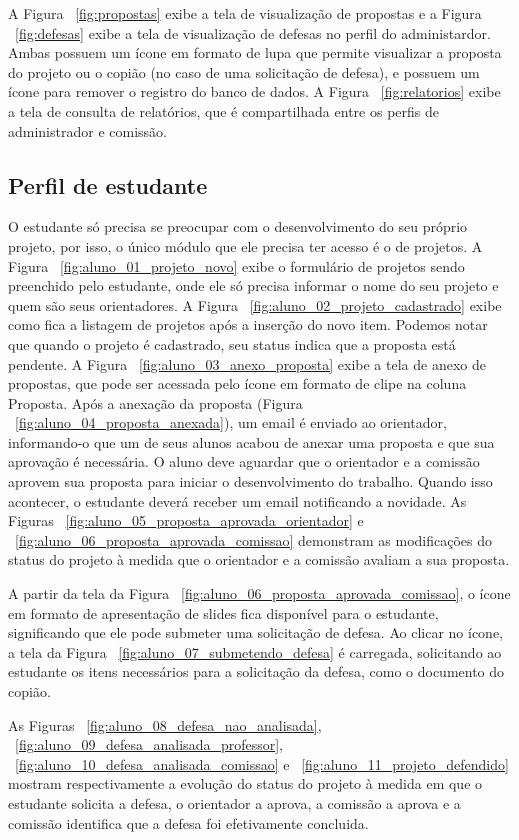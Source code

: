 A Figura ~\ref{fig:propostas} exibe a tela de visualização de propostas e a Figura ~\ref{fig:defesas}
exibe a tela de visualização de defesas no perfil do administardor. Ambas possuem um ícone em formato
de lupa que permite visualizar a proposta do projeto ou o copião (no caso de uma solicitação de defesa), e
possuem um ícone para remover o registro do banco de dados. A Figura ~\ref{fig:relatorios} exibe a tela
de consulta de relatórios, que é compartilhada entre os perfis de administrador e comissão.

\subsection{Perfil de estudante}
O estudante só precisa se preocupar com o desenvolvimento do seu próprio projeto, por isso, o único
módulo que ele precisa ter acesso é o de projetos. A Figura ~\ref{fig:aluno_01_projeto_novo} exibe
o formulário de projetos sendo preenchido pelo estudante, onde ele só precisa informar o nome do
seu projeto e quem são seus orientadores. A Figura ~\ref{fig:aluno_02_projeto_cadastrado} exibe como fica
a listagem de projetos após a inserção do novo item. Podemos notar que quando o projeto é cadastrado, seu 
status indica que a proposta está pendente. A Figura ~\ref{fig:aluno_03_anexo_proposta} exibe a tela de anexo
de propostas, que pode ser acessada pelo ícone em formato de clipe na coluna Proposta. Após a anexação
da proposta (Figura ~\ref{fig:aluno_04_proposta_anexada}), um email é enviado ao orientador, informando-o
que um de seus alunos acabou de anexar uma proposta e que sua aprovação é necessária. O aluno
deve aguardar que o orientador e a comissão aprovem sua proposta para iniciar o desenvolvimento do
trabalho. Quando isso acontecer, o estudante deverá receber um email notificando a novidade.
As Figuras ~\ref{fig:aluno_05_proposta_aprovada_orientador} e ~\ref{fig:aluno_06_proposta_aprovada_comissao}
demonstram as modificações do status do projeto à medida que o orientador e a comissão avaliam 
a sua proposta.

A partir da tela da Figura ~\ref{fig:aluno_06_proposta_aprovada_comissao}, o ícone em formato de apresentação
de slides fica disponível para o estudante, significando que ele pode submeter uma solicitação de defesa. Ao
clicar no ícone, a tela da Figura ~\ref{fig:aluno_07_submetendo_defesa} é carregada, solicitando ao
estudante os itens necessários para a solicitação da defesa, como o documento do copião.

As Figuras ~\ref{fig:aluno_08_defesa_nao_analisada}, ~\ref{fig:aluno_09_defesa_analisada_professor}, 
~\ref{fig:aluno_10_defesa_analisada_comissao} e ~\ref{fig:aluno_11_projeto_defendido} mostram 
respectivamente a evolução do status do projeto à medida em que o estudante solicita
a defesa, o orientador a aprova, a comissão a aprova e a comissão identifica que a defesa foi efetivamente concluida.


